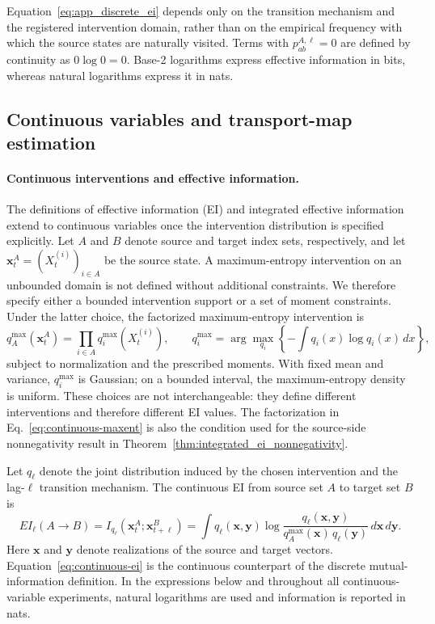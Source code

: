 Equation~\eqref{eq:app_discrete_ei} depends only on the transition mechanism
and the registered intervention domain, rather than on the empirical
frequency with which the source states are naturally visited. Terms with
\(p_{ab}^{A,\ell}=0\) are defined by continuity as
\(0\log 0=0\). Base-2 logarithms express effective information in bits,
whereas natural logarithms express it in nats.

\subsection{Continuous variables and transport-map estimation}
\label{app:continuous_estimation}

\paragraph{Continuous interventions and effective information.}
The definitions of effective information (EI) and integrated effective
information extend to continuous variables once the intervention
distribution is specified explicitly.  Let \(A\) and \(B\) denote source and
target index sets, respectively, and let
\(\boldsymbol{x}_{t}^{A}=(X_t^{(i)})_{i\in A}\) be the source state.  A
maximum-entropy intervention on an unbounded domain is not defined without
additional constraints.  We therefore specify either a bounded intervention
support or a set of moment constraints.  Under the latter choice, the
factorized maximum-entropy intervention is
\begin{equation}
q_A^{\max}(\boldsymbol{x}_{t}^{A})
=
\prod_{i\in A}q_i^{\max}\!\left(X_t^{(i)}\right),
\qquad
q_i^{\max}
=
\arg\max_{q_i}
\left\{
-\int q_i(x)\log q_i(x)\,dx
\right\},
\label{eq:continuous-maxent}
\end{equation}
subject to normalization and the prescribed moments.  With fixed mean and
variance, \(q_i^{\max}\) is Gaussian; on a bounded interval, the
maximum-entropy density is uniform.  These choices are not interchangeable:
they define different interventions and therefore different EI values.  The
factorization in Eq.~\eqref{eq:continuous-maxent} is also the condition used
for the source-side nonnegativity result in
Theorem~\ref{thm:integrated_ei_nonnegativity}.

Let \(q_\ell\) denote the joint distribution induced by the chosen
intervention and the lag-\(\ell\) transition mechanism.  The continuous EI
from source set \(A\) to target set \(B\) is
\begin{equation}
EI_\ell(A\!\to\!B)
=
I_{q_\ell}
\!\left(
\boldsymbol{x}_{t}^{A};
\boldsymbol{x}_{t+\ell}^{B}
\right)
=
\int
q_\ell(\boldsymbol{x},\boldsymbol{y})
\log
\frac{
q_\ell(\boldsymbol{x},\boldsymbol{y})
}{
q_A^{\max}(\boldsymbol{x})\,
q_\ell(\boldsymbol{y})
}
\,d\boldsymbol{x}\,d\boldsymbol{y}.
\label{eq:continuous-ei}
\end{equation}
Here \(\boldsymbol{x}\) and \(\boldsymbol{y}\) denote realizations of the
source and target vectors.  Equation~\eqref{eq:continuous-ei} is the
continuous counterpart of the discrete mutual-information definition. In the expressions below and throughout all continuous-variable experiments, natural logarithms are used and information is reported in nats.



